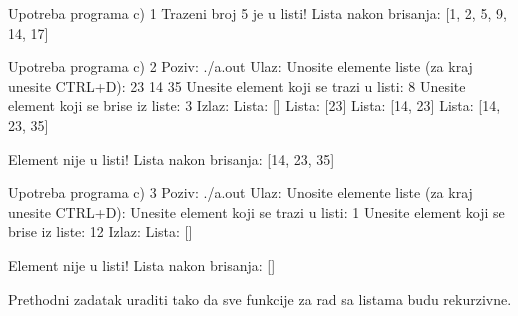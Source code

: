\begin{Exercise}[label=601]
\begin{maxitest}
\begin{test}{Upotreba programa c) 1}
  Trazeni broj 5 je u listi!
  Lista nakon brisanja:  [1, 2, 5, 9, 14, 17]
\end{test}
\end{maxitest}
\begin{maxitest}
\begin{test}{Upotreba programa c) 2}
Poziv: ./a.out
Ulaz:
  Unosite elemente liste (za kraj unesite CTRL+D): 23 14 35
  Unesite element koji se trazi u listi: 8
  Unesite element koji se brise iz liste: 3
Izlaz:
  Lista: []
  Lista: [23]
  Lista: [14, 23]
  Lista: [14, 23, 35]
  
  Element nije u listi!
  Lista nakon brisanja:  [14, 23, 35]
\end{test}
\end{maxitest}
\begin{maxitest}
\begin{test}{Upotreba programa c) 3}
Poziv: ./a.out
Ulaz:
  Unosite elemente liste (za kraj unesite CTRL+D): 
  Unesite element koji se trazi u listi: 1
  Unesite element koji se brise iz liste: 12
Izlaz:
  Lista: []
  
  Element nije u listi!
  Lista nakon brisanja:  []
\end{test}
\end{maxitest}
\end{Exercise}
\begin{Answer}[ref=601]
\end{Answer}

\begin{Exercise}[label=602]
Prethodni zadatak uraditi tako da sve funkcije za rad sa listama budu rekurzivne.
\end{Exercise}
\begin{Answer}[ref=602]
\end{Answer}

